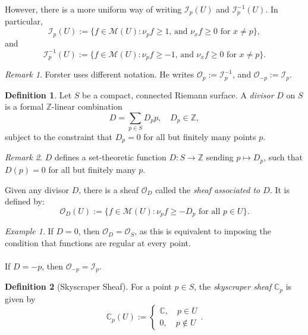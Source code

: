 \documentclass[a4paper]{report}
\theoremstyle{definition}
\newtheorem{definition}{Definition}
\theoremstyle{remark}
\newtheorem{remark}{Remark}
\theoremstyle{proposition}
\theoremstyle{conjecture}
\theoremstyle{lemma}
\theoremstyle{corollary}
\theoremstyle{exercise}
\theoremstyle{example}
\newtheorem{example}{Example}
\newcommand{\C}{\mathbb{C}}
\newcommand{\mcal}{\mathcal}
\begin{document}
However, there is a more uniform way of writing $\mcal{I}_p(U)$ and 
$\mcal{I}_p^{-1}(U)$. In particular,
$$\mcal{I}_p(U) := \lbrace f\in\mcal{M}(U) : \text{$\nu_pf\geq 1$, and $\nu_xf\geq 0$ for $x\neq p$}\rbrace,$$
and $$\mcal{I}_p^{-1}(U) := \lbrace f\in \mcal{M}(U) : \text{$\nu_pf\geq -1$, and $\nu_xf \geq 0$ for $x\neq p$}\rbrace.$$

\begin{remark}
    Forster uses different notation. He writes 
    $\mcal{O}_p := \mcal{I}_p^{-1}$, and $\mcal{O}_{-p}:= \mcal{I}_p$.
\end{remark}

\begin{definition}
    Let $S$ be a compact, connected Riemann surface. A \emph{divisor} $D$
    on $S$ is a formal $\mathbb{Z}$-linear combination 
    $$D = \sum_{p\in S} D_pp,\quad D_p \in \mathbb{Z},$$
    subject to the constraint that $D_p=0$ for all but finitely many points
    $p$.
\end{definition}

\begin{remark}
    $D$ defines a set-theoretic function $D: S\to\mathbb{Z}$
    sending $p\mapsto D_p$, such that $D(p)= 0$ for all but finitely
    many $p$.
\end{remark}

Given any divisor $D$, there is a sheaf $\mcal{O}_D$ called the 
\emph{sheaf associated to $D$}. It is defined by:
$$\mcal{O}_D(U) := \lbrace f\in \mcal{M}(U) : \text{$\nu_pf \geq -D_p$ 
for all $p \in U$}\rbrace.$$

\begin{example}
    If $D = 0$, then $\mcal{O}_D = \mcal{O}_S$, as this is equivalent to 
    imposing the condition that functions are regular at every point.\\\\
    If $D = -p$, then $\mcal{O}_{-p} = \mcal{I}_p$.
\end{example}

\begin{definition}[Skyscraper Sheaf]
    For a point $p\in S$, the \emph{skyscraper sheaf} $\C_p$ is given by
    $$\C_p(U) := \begin{cases}
        \C,\quad p\in U\\
        0,\quad p \not\in U
    \end{cases}.$$
\end{definition}
\end{document}
